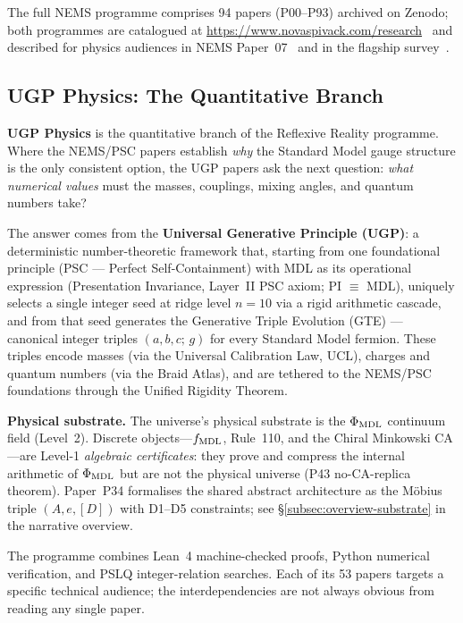 \documentclass[11pt]{article}
\begin{document}
The full NEMS programme comprises 94 papers (P00--P93) archived on Zenodo; both programmes are catalogued at
\url{https://www.novaspivack.com/research}~\cite{SpivackResearchProgrammes} and described for physics audiences
in NEMS Paper~07~\cite{SpivackNEMS07} and in the flagship survey~\cite{SpivackNEMS88}.

\subsection{UGP Physics: The Quantitative Branch}

\textbf{UGP Physics} is the quantitative branch of the Reflexive Reality programme.
Where the NEMS/PSC papers establish \emph{why} the Standard Model gauge structure
is the only consistent option, the UGP papers ask the next question: \emph{what
numerical values} must the masses, couplings, mixing angles, and quantum numbers
take?

The answer comes from the \textbf{Universal Generative Principle (UGP)}: a deterministic
number-theoretic framework that, starting from one foundational principle (PSC ---
Perfect Self-Containment) with MDL as its operational expression (Presentation
Invariance, Layer~II PSC axiom; PI $\equiv$ MDL), uniquely selects a single integer seed at ridge level
$n{=}10$ via a rigid arithmetic cascade, and from that seed generates the
Generative Triple Evolution (GTE) --- canonical integer triples $(a,b,c;\,g)$ for
every Standard Model fermion.  These triples encode masses (via the Universal
Calibration Law, UCL), charges and quantum numbers (via the Braid Atlas), and are
tethered to the NEMS/PSC foundations through the Unified Rigidity Theorem.

\medskip
\noindent\textbf{Physical substrate.}  The universe's physical substrate is the
$\Phi_{\rm MDL}$ continuum field (Level~2).  Discrete objects---$f_{\rm MDL}$,
Rule~110, and the Chiral Minkowski CA---are Level-1 \emph{algebraic certificates}:
they prove and compress the internal arithmetic of $\Phi_{\rm MDL}$ but are not
the physical universe (P43 no-CA-replica theorem).  Paper~P34 formalises the
shared abstract architecture as the Möbius triple $(A,e,[D])$ with D1--D5
constraints; see \S\ref{subsec:overview-substrate} in the narrative overview.

The programme combines Lean~4 machine-checked proofs, Python numerical verification,
and PSLQ integer-relation searches.  Each of its 53 papers targets a specific
technical audience; the interdependencies are not always obvious from reading any
single paper.
\end{document}
